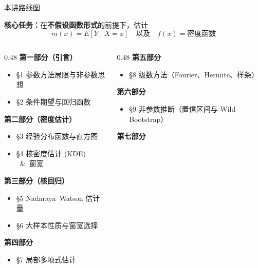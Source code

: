 \documentclass[aspectratio=169, 10pt]{beamer}
\begin{document}
\begin{frame}{本讲路线图}

  \begin{highlightbox}
    \textbf{核心任务：}在\textbf{不假设函数形式}的前提下，估计
    \[
      m(x) = E[Y \mid X = x] \quad\text{以及}\quad f(x) = \text{密度函数}
    \]
  \end{highlightbox}

  \vspace{0.3em}

  \begin{columns}[T]
    \begin{column}{0.48\textwidth}
      \textbf{第一部分（引言）}
      \begin{itemize}\footnotesize
        \item §1 参数方法局限与非参数思想
        \item §2 条件期望与回归函数
      \end{itemize}
      \textbf{第二部分（密度估计）}
      \begin{itemize}\footnotesize
        \item §3 经验分布函数与直方图
        \item §4 核密度估计 (KDE) \ \&\ 窗宽
      \end{itemize}
      \textbf{第三部分（核回归）}
      \begin{itemize}\footnotesize
        \item §5 Nadaraya--Watson 估计量
        \item §6 大样本性质与窗宽选择
      \end{itemize}
      \textbf{第四部分}
      \begin{itemize}\footnotesize
        \item §7 局部多项式估计
      \end{itemize}
    \end{column}
    \begin{column}{0.48\textwidth}
      \textbf{第五部分}
      \begin{itemize}\footnotesize
        \item §8 级数方法（Fourier、Hermite、样条）
      \end{itemize}
      \textbf{第六部分}
      \begin{itemize}\footnotesize
        \item §9 非参数推断（置信区间与 Wild Bootstrap）
      \end{itemize}
      \textbf{第七部分}
      \begin{itemize}\footnotesize

\end{itemize}
\end{column}
\end{columns}
\end{frame}
\end{document}
